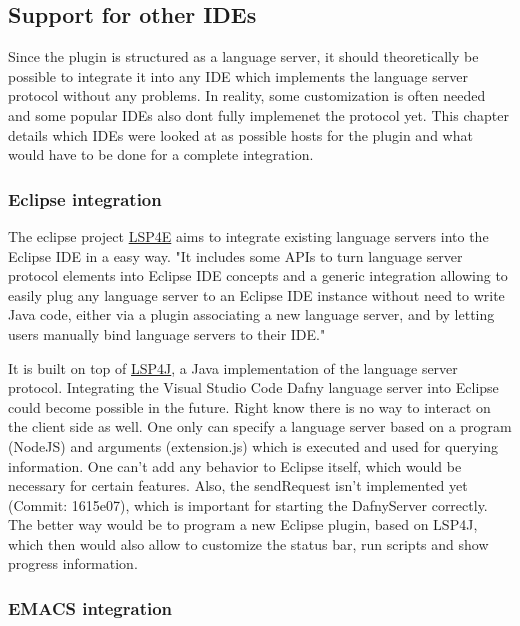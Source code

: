 \subsection{Support for other IDEs} \label{ides}
Since the plugin is structured as a language server, it should theoretically be possible to integrate it into any IDE which implements the language server protocol without any problems. In reality, some customization is often needed and some popular IDEs also dont fully implemenet the protocol yet. This chapter details which IDEs were looked at as possible hosts for the plugin and what would have to be done for a complete integration.

\subsubsection{Eclipse integration}
The eclipse project \href{https://projects.eclipse.org/projects/technology.lsp4e}{LSP4E} aims to integrate existing language servers into the Eclipse IDE in a easy way. 
\newline
"It includes some APIs to turn language server protocol elements into Eclipse IDE concepts and a generic integration allowing to easily plug any language server to an Eclipse IDE instance without need to write Java code, either via a plugin associating a new language server, and by letting users manually bind language servers to their IDE." \cite{lsp4e}

It is built on top of \href{https://github.com/eclipse/lsp4j}{LSP4J}, a Java implementation of the language server protocol. 
\newline
Integrating the Visual Studio Code Dafny language server into Eclipse could become possible in the future. Right know there is no way to interact on the client side as well. One only can specify a language server based on a program (NodeJS) and arguments (extension.js) which is executed and used for querying information. One can't add any behavior to Eclipse itself, which would be necessary for certain features. Also, the sendRequest isn't implemented yet (Commit: 1615e07), which is important for starting the DafnyServer correctly. 
The better way would be to program a new Eclipse plugin, based on LSP4J, which then would also allow to customize the status bar, run scripts and show progress information. 


\subsubsection{EMACS integration}